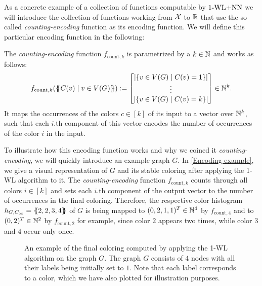 As a concrete example of a collection of functions computable by $\text{1-WL+NN}$ we will introduce the collection of functions working from $\mathcal{X}$ to $\mathbb{R}$ that use the so called \emph{counting-encoding} function as its encoding function.
We will define this particular encoding function in the following:

\begin{definition}\label{def:counting_encoding}
    The \emph{counting-encoding} function $f_{\text{count}, k}$ is parametrized by a $k \in \mathbb{N}$ and works as follows:
    \begin{equation*}
        f_{\text{count}, k}(\{\!\!\{ C(v)  \mid v \in V(G) \}\!\!\}) := \begin{bmatrix}
            |\{ v \in V(G) \mid C(v) = 1 \}|\\
            \vdots\\
            |\{ v \in V(G) \mid C(v) = k \}|\\
        \end{bmatrix} \in \mathbb{N}^k.
    \end{equation*}
    It maps the occurrences of the colors $c \in [k]$ of its input to a vector over $\mathbb{N}^k$, such that each $i$.th component of this vector encodes the number of occurrences of the color $i$ in the input.
\end{definition}

To illustrate how this encoding function works and why we coined it \emph{counting-encoding}, we will quickly introduce an example graph $G$. In \autoref{Encoding example}, we give a visual representation of $G$ and its stable coloring after applying the 1-WL algorithm to it. The \emph{counting-encoding} function $f_{\text{count}, k}$ counts through all colors $i \in [k]$ and sets each $i$.th component of the output vector to the number of occurrences in the final coloring. Therefore, the respective color histogram $h_{G, C_\infty} = \{\!\!\{ 2, 2, 3, 4 \}\!\!\}$ of $G$ is being mapped to $(0,2,1,1)^T \in \mathbb{N}^4$ by $f_{\text{count}, 4}$ and to $(0,2)^T \in \mathbb{N}^2$ by $f_{\text{count}, 2}$ for example, since color $2$ appears two times, while color $3$ and $4$ occur only once.
\begin{figure}[H]
    \centering
    
    \caption{An example of the final coloring computed by applying the 1-WL algorithm on the graph $G$. The graph $G$ consists of $4$ nodes with all their labels being initially set to $1$. Note that each label corresponds to a color, which we have also plotted for illustration purposes.}
    \label{Encoding example}
\end{figure}

